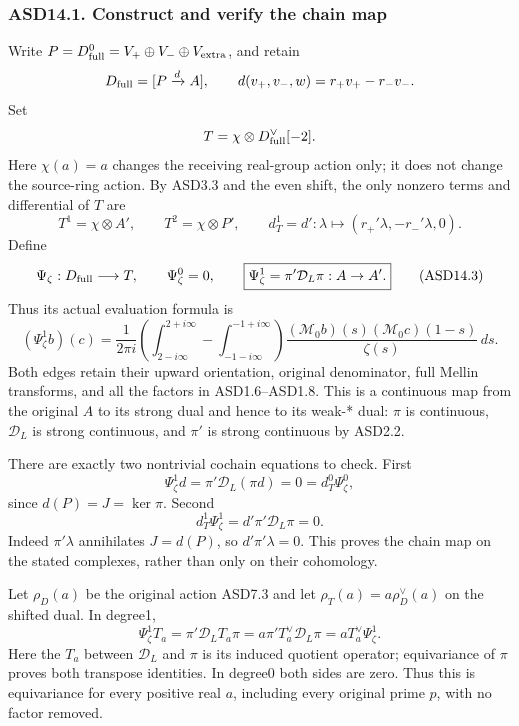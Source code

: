 \subsubsection{ASD14.1. Construct and verify the chain
map}\label{asd14.1.-construct-and-verify-the-chain-map}

Write \(P=D_{\rm full}^0=V_+\oplus V_-\oplus V_{\rm extra}\), and retain
\[
 D_{\rm full}=[P\xrightarrow{d}A],\qquad
 d(v_+,v_-,w)=r_+v_+-r_-v_-.
\] Set \[
 T=\chi\otimes D_{\rm full}^\vee[-2].
\] Here \(\chi(a)=a\) changes the receiving real-group action only; it
does not change the source-ring action. By ASD3.3 and the even shift,
the only nonzero terms and differential of \(T\) are \[
 T^1=\chi\otimes A',\qquad T^2=\chi\otimes P',\qquad
 d_T^1=d' :\lambda\mapsto(r_+'\lambda,-r_-'\lambda,0).
 \tag{ASD14.2}
\] Define \[
 \Psi_\zeta:D_{\rm full}\longrightarrow T,\qquad
 \Psi_\zeta^0=0,\qquad
 \boxed{\Psi_\zeta^1=\pi'\mathcal D_L\pi:A\to A'.}
 \tag{ASD14.3}
\] Thus its actual evaluation formula is \[
 (\Psi_\zeta^1b)(c)
 =\frac1{2\pi i}
 \left(\int_{2-i\infty}^{2+i\infty}
       -\int_{-1-i\infty}^{-1+i\infty}\right)
 \frac{(\mathcal M_0b)(s)(\mathcal M_0c)(1-s)}
      {\zeta(s)}\,ds .
 \tag{ASD14.4}
\] Both edges retain their upward orientation, original denominator,
full Mellin transforms, and all the factors in ASD1.6--ASD1.8. This is a
continuous map from the original \(A\) to its strong dual and hence to
its weak-* dual: \(\pi\) is continuous, \(\mathcal D_L\) is strong
continuous, and \(\pi'\) is strong continuous by ASD2.2.

There are exactly two nontrivial cochain equations to check. First \[
 \Psi_\zeta^1d=\pi'\mathcal D_L(\pi d)=0
   =d_T^0\Psi_\zeta^0,
\] since \(d(P)=J=\ker\pi\). Second \[
 d_T^1\Psi_\zeta^1=d'\pi'\mathcal D_L\pi=0.
\] Indeed \(\pi'\lambda\) annihilates \(J=d(P)\), so
\(d'\pi'\lambda=0\). This proves the chain map on the stated complexes,
rather than only on their cohomology.

Let \(\rho_D(a)\) be the original action ASD7.3 and let
\(\rho_T(a)=a\rho_D^\vee(a)\) on the shifted dual. In degree1, \[
 \Psi_\zeta^1 T_a
 =\pi'\mathcal D_LT_a\pi
 =a\pi'T_a^\vee\mathcal D_L\pi
 =aT_a^\vee\Psi_\zeta^1.
 \tag{ASD14.5}
\] Here the \(T_a\) between \(\mathcal D_L\) and \(\pi\) is its induced
quotient operator; equivariance of \(\pi\) proves both transpose
identities. In degree0 both sides are zero. Thus this is equivariance
for every positive real \(a\), including every original prime \(p\),
with no factor removed.

